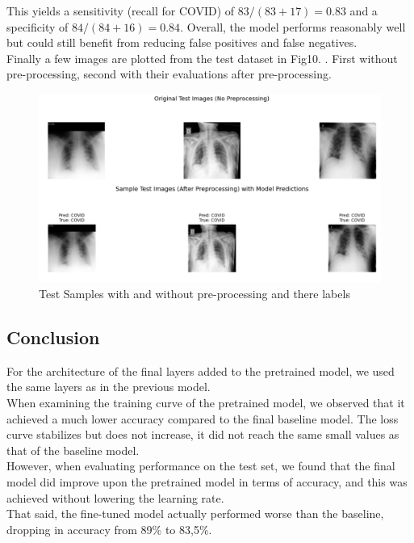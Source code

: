 \documentclass[conference]{IEEEtran}
\begin{document}
This yields a sensitivity (recall for COVID) of $83/(83+17)=0.83$ and a specificity of $84/(84+16)=0.84$. Overall, the model performs reasonably well but could still benefit from reducing false positives and false negatives. \\ 



Finally a few images are plotted from the test dataset in Fig10. . First without pre-processing, second with their evaluations after pre-processing.\\	

\begin{figure}[htbp]
	\centerline{\includegraphics[width=\linewidth]{Images/Transferlearning_4.png}}
	\caption{Test Samples with and without pre-processing and there labels}
	\label{fig:transferlearning_4}
\end{figure}


\subsection{Conclusion}
For the architecture of the final layers added to the pretrained model, we used the same layers as in the previous model.\\

When examining the training curve of the pretrained model, we observed that it achieved a much lower accuracy compared to the final baseline model. The loss curve stabilizes but does not increase, it did not reach the same small values as that of the baseline model.\\

However, when evaluating performance on the test set, we found that the final model did improve upon the pretrained model in terms of accuracy, and this was achieved without lowering the learning rate.\\
That said, the fine-tuned model actually performed worse than the baseline, dropping in accuracy from 89\% to 83,5\%.\\
\end{document}
